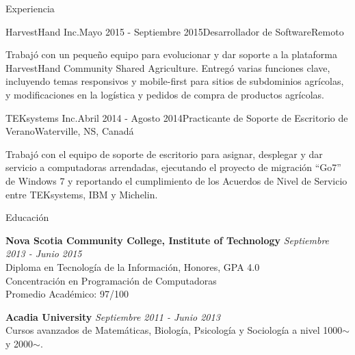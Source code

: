 \documentclass{resume} %
\begin{document}
\begin{rSection}{Experiencia}
		\begin{rSubsection}{HarvestHand Inc.}{Mayo 2015 - Septiembre 2015}{Desarrollador de Software}{Remoto}
			\item[] Trabajó con un pequeño equipo para evolucionar y dar soporte a la plataforma HarvestHand Community Shared Agriculture. Entregó varias funciones clave, incluyendo temas responsivos y mobile-first para sitios de subdominios agrícolas, y modificaciones en la logística y pedidos de compra de productos agrícolas.
		\end{rSubsection}
		
		\begin{rSubsection}{TEKsystems Inc.}{Abril 2014 - Agosto 2014}{Practicante de Soporte de Escritorio de Verano}{Waterville, NS, Canadá}
			\item[] Trabajó con el equipo de soporte de escritorio para asignar, desplegar y dar servicio a computadoras arrendadas, ejecutando el proyecto de migración “Go7” de Windows 7 y reportando el cumplimiento de los Acuerdos de Nivel de Servicio entre TEKsystems, IBM y Michelin.
		\end{rSubsection}
		
	\end{rSection}
	
	
	\begin{rSection}{Educación}
		
		{\bf Nova Scotia Community College, Institute of Technology} \hfill {\em Septiembre 2013 - Junio 2015} \\ 
		Diploma en Tecnología de la Información, Honores, GPA 4.0 \\
		Concentración en Programación de Computadoras \\
		Promedio Académico: 97/100 
		
		\vspace{3mm}
		{\bf Acadia University} \hfill {\em Septiembre 2011 - Junio 2013} \\ 
		Cursos avanzados de Matemáticas, Biología, Psicología y Sociología a nivel 1000$\sim$ y 2000$\sim$.
		
	\end{rSection}
	
\end{document}
